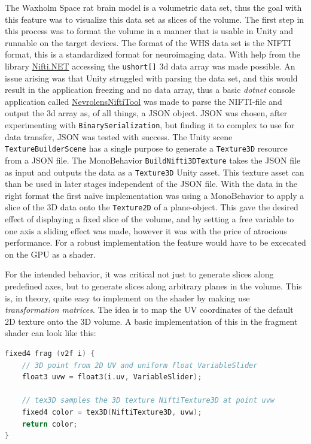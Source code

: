 The Waxholm Space rat brain model is a volumetric data set, thus the goal with this feature was to visualize this data set as slices of the volume. The first step in this process was to format the volume in a manner that is usable in Unity and runnable on the target devices. The format of the WHS data set is the NIFTI format, this is a standardized format for neuroimaging data. With help from the library \href{https://github.com/plwp/Nifti.NET}{Nifti.NET} accessing the \texttt{ushort[]} 3d data array was made possible. An issue arising was that Unity struggled with parsing the data set, and this would result in the application freezing and no data array, thus a basic \textit{dotnet} console application called \href{https://github.com/ovravna/NevrolensNiftiTool}{NevrolensNiftiTool} was made to parse the NIFTI-file and output the 3d array as, of all things, a JSON object. JSON was chosen, after experimenting with \texttt{BinarySerialization}, but finding it to complex to use for data transfer, JSON was tested with success. The Unity scene \texttt{TextureBuilderScene} has a single purpose to generate a \texttt{Texture3D} resource from a JSON file. The MonoBehavior \texttt{BuildNifti3DTexture} takes the JSON file as input and outputs the data as a \texttt{Texture3D} Unity asset. This texture asset can than be used in later stages independent of the JSON file. 
With the data in the right format the first naïve implementation was using a MonoBehavior to apply a slice of the 3D data onto the \texttt{Texture2D} of a plane-object. This gave the desired effect of displaying a fixed slice of the volume, and by setting a free variable to one axis a sliding effect was made, however it was with the price of atrocious performance. For a robust implementation the feature would have to be excecated on the GPU as a shader. 

For the intended behavior, it was critical not just to generate slices along predefined axes, but to generate slices along arbitrary planes in the volume. This is, in theory, quite easy to implement on the shader by making use \textit{transformation matrices}. The idea is to map the UV coordinates of the default 2D texture onto the 3D volume. A basic implementation of this in the fragment shader can look like this:

\newpage
\begin{lstlisting}[language=c]
fixed4 frag (v2f i) {
    // 3D point from 2D UV and uniform float VariableSlider
    float3 uvw = float3(i.uv, VariableSlider);

    // tex3D samples the 3D texture NiftiTexture3D at point uvw
    fixed4 color = tex3D(NiftiTexture3D, uvw);
    return color;
}
\end{lstlisting}

